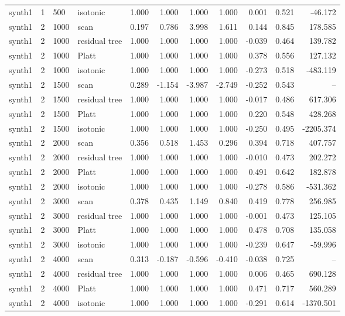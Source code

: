 \begin{tabular}{lrllrrrrrrr}
synth1 & 1 & 500 & isotonic & 1.000 & 1.000 & 1.000 & 1.000 & 0.001 & 0.521 & -46.172 \\
synth1 & 2 & 1000 & scan & 0.197 & 0.786 & 3.998 & 1.611 & 0.144 & 0.845 & 178.585 \\
synth1 & 2 & 1000 & residual tree & 1.000 & 1.000 & 1.000 & 1.000 & -0.039 & 0.464 & 139.782 \\
synth1 & 2 & 1000 & Platt & 1.000 & 1.000 & 1.000 & 1.000 & 0.378 & 0.556 & 127.132 \\
synth1 & 2 & 1000 & isotonic & 1.000 & 1.000 & 1.000 & 1.000 & -0.273 & 0.518 & -483.119 \\
synth1 & 2 & 1500 & scan & 0.289 & -1.154 & -3.987 & -2.749 & -0.252 & 0.543 & -- \\
synth1 & 2 & 1500 & residual tree & 1.000 & 1.000 & 1.000 & 1.000 & -0.017 & 0.486 & 617.306 \\
synth1 & 2 & 1500 & Platt & 1.000 & 1.000 & 1.000 & 1.000 & 0.220 & 0.548 & 428.268 \\
synth1 & 2 & 1500 & isotonic & 1.000 & 1.000 & 1.000 & 1.000 & -0.250 & 0.495 & -2205.374 \\
synth1 & 2 & 2000 & scan & 0.356 & 0.518 & 1.453 & 0.296 & 0.394 & 0.718 & 407.757 \\
synth1 & 2 & 2000 & residual tree & 1.000 & 1.000 & 1.000 & 1.000 & -0.010 & 0.473 & 202.272 \\
synth1 & 2 & 2000 & Platt & 1.000 & 1.000 & 1.000 & 1.000 & 0.491 & 0.642 & 182.878 \\
synth1 & 2 & 2000 & isotonic & 1.000 & 1.000 & 1.000 & 1.000 & -0.278 & 0.586 & -531.362 \\
synth1 & 2 & 3000 & scan & 0.378 & 0.435 & 1.149 & 0.840 & 0.419 & 0.778 & 256.985 \\
synth1 & 2 & 3000 & residual tree & 1.000 & 1.000 & 1.000 & 1.000 & -0.001 & 0.473 & 125.105 \\
synth1 & 2 & 3000 & Platt & 1.000 & 1.000 & 1.000 & 1.000 & 0.478 & 0.708 & 135.058 \\
synth1 & 2 & 3000 & isotonic & 1.000 & 1.000 & 1.000 & 1.000 & -0.239 & 0.647 & -59.996 \\
synth1 & 2 & 4000 & scan & 0.313 & -0.187 & -0.596 & -0.410 & -0.038 & 0.725 & -- \\
synth1 & 2 & 4000 & residual tree & 1.000 & 1.000 & 1.000 & 1.000 & 0.006 & 0.465 & 690.128 \\
synth1 & 2 & 4000 & Platt & 1.000 & 1.000 & 1.000 & 1.000 & 0.471 & 0.717 & 560.289 \\
synth1 & 2 & 4000 & isotonic & 1.000 & 1.000 & 1.000 & 1.000 & -0.291 & 0.614 & -1370.501 \\

\end{tabular}
